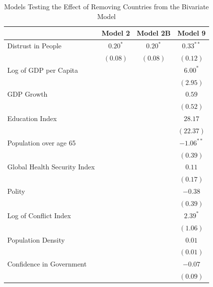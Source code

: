 \documentclass[
  11pt,
]{article}
\begin{document}
\begin{table}
\caption{Models Testing the Effect of Removing Countries from the Bivariate Model}
\begin{center}
\begin{tabular}{l c c c}
\hline
 & Model 2 & Model 2B & Model 9 \\
\hline
Distrust in People           & $0.20^{*}$ & $0.20^{*}$ & $0.33^{**}$  \\
                             & $(0.08)$   & $(0.08)$   & $(0.12)$     \\
Log of GDP per Capita        &            &            & $6.00^{*}$   \\
                             &            &            & $(2.95)$     \\
GDP Growth                   &            &            & $0.59$       \\
                             &            &            & $(0.52)$     \\
Education Index              &            &            & $28.17$      \\
                             &            &            & $(22.37)$    \\
Population over age 65       &            &            & $-1.06^{**}$ \\
                             &            &            & $(0.39)$     \\
Global Health Security Index &            &            & $0.11$       \\
                             &            &            & $(0.17)$     \\
Polity                       &            &            & $-0.38$      \\
                             &            &            & $(0.39)$     \\
Log of Conflict Index        &            &            & $2.39^{*}$   \\
                             &            &            & $(1.06)$     \\
Population Density           &            &            & $0.01$       \\
                             &            &            & $(0.01)$     \\
Confidence in Government     &            &            & $-0.07$      \\
                             &            &            & $(0.09)$     \\

\end{tabular}
\end{center}
\end{table}
\end{document}
